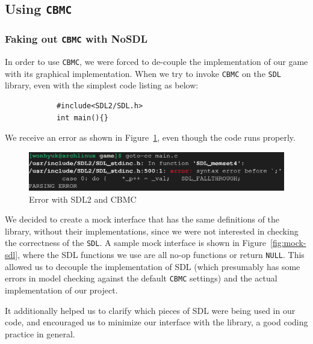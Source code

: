 \documentclass{article}
\newcommand{\cbmc}{\texttt{CBMC}}
\newcommand{\sdl}{\texttt{SDL}}
\begin{document}
    \subsection{Using \cbmc{}}

        \subsubsection{Faking out \cbmc{} with NoSDL}

            In order to use \cbmc{}, we were forced to de-couple the
            implementation of our game with its graphical implementation.
            When we try to invoke \cbmc{} on the \sdl{} library, even with
            the simplest code listing as below:

            \begin{verbatim}
            #include<SDL2/SDL.h>
            int main(){}
            \end{verbatim}

            We receive an error as shown in Figure~\ref{fig:cbmc-sdl}, even
            though the code runs properly.

            \begin{figure}[h!]
                \includegraphics[width=\linewidth]{cbmc-sdl.png}
                \caption{Error with SDL2 and CBMC}
                \label{fig:cbmc-sdl}
            \end{figure}

            We decided to create a mock interface that has the same definitions
            of the library, without their implementations, since we were not
            interested in checking the correctness of the \sdl{}.
            A sample mock interface is shown in Figure~\ref{fig:mock-sdl}, where
            the SDL functions we use are all no-op functions or return
            \texttt{NULL}. This allowed us to decouple the implementation of
            SDL (which presumably has some errors in model checking against the
            default \cbmc{} settings) and the actual implementation of our
            project.

            It additionally helped us to clarify which pieces of SDL were being
            used in our code, and encouraged us to minimize our interface with
            the library, a good coding practice in general.
\end{document}
